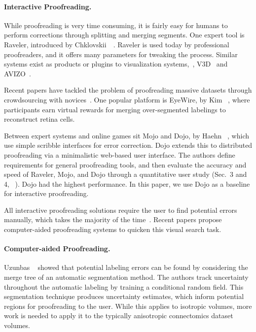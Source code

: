 \paragraph{Interactive Proofreading.} While proofreading is very time consuming, it is fairly easy for humans to perform corrections through splitting and merging segments. One expert tool is Raveler, introduced by Chklovskii~\etal~\cite{chklovskii2010, raveler}. Raveler is used today by professional proofreaders, and it offers many parameters for tweaking the process. Similar systems exist as products or plugins to visualization systems,~\eg, V3D~\cite{proofreading_bottleneck} and AVIZO~\cite{markus_proofreading}.

Recent papers have tackled the problem of proofreading massive datasets through crowdsourcing with novices~\cite{saalfeld09,anderson2011,Giuly2013DP2}. One popular platform is EyeWire, by Kim \etal~\cite{eyewire_nature}, where participants earn virtual rewards for merging over-segmented labelings to reconstruct retina cells.

Between expert systems and online games sit Mojo and Dojo, by Haehn
\etal~\cite{haehn_dojo_2014,Neuroblocks}, which use simple scribble interfaces
for error correction. Dojo extends this to distributed proofreading via a
minimalistic web-based user interface. The authors define requirements for
general proofreading tools, and then evaluate the accuracy and speed of Raveler,
Mojo, and Dojo through a quantitative user study (Sec.~3 and
4, ~\cite{haehn_dojo_2014}). Dojo had the highest performance. In this paper, we
use Dojo as a baseline for interactive proofreading.

All interactive proofreading solutions require the user to find potential errors manually, which takes the majority of the time~\cite{proofreading_bottleneck,haehn_dojo_2014}. Recent papers propose computer-aided proofreading systems to quicken this visual search task.

\paragraph{Computer-aided Proofreading.} Uzunbas \etal~\cite{uzunbas} showed that potential labeling errors can be found by considering the merge tree of an automatic segmentation method. The authors track uncertainty throughout the automatic labeling by training a conditional random field. This segmentation technique produces uncertainty estimates, which inform potential regions for proofreading to the user. While this applies to isotropic volumes, more work is needed to apply it to the typically anisotropic connectomics dataset volumes.

